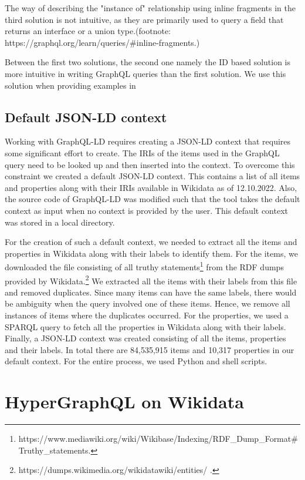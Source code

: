 The way of describing the "instance of" relationship using inline fragments in the third solution  is not intuitive, as they are primarily used to query a field that returns an interface or a union type.(footnote: https://graphql.org/learn/queries/\#inline-fragments.) 

Between the first two solutions, the second one namely the ID based solution is more intuitive in writing GraphQL queries than the first solution.  We use this solution when providing examples in 

\subsection{Default JSON-LD context}

Working with GraphQL-LD requires creating a JSON-LD context that requires some significant effort to create. The IRIs of the items used in the GraphQL query need to be looked up and then inserted into the context. To overcome this constraint we created a default JSON-LD context. This contains a list of all items and properties along with their IRIs available in Wikidata as of 12.10.2022. Also, the source code of GraphQL-LD was modified such that the tool takes the default context as input when no context is provided by the user. This default context was stored in a local directory.

For the creation of such a default context, we needed to extract all the items and properties in Wikidata along with their labels to identify them. For the items, we downloaded the file consisting of all truthy statements\footnote{https://www.mediawiki.org/wiki/Wikibase/Indexing/RDF\_Dump\_Format\#Truthy\_statements.} from the RDF dumps provided by Wikidata.\footnote{https://dumps.wikimedia.org/wikidatawiki/entities/ .} We extracted all the items with their labels from this file and removed duplicates. Since many items can have the same labels, there would be ambiguity when the query involved one of these items. Hence, we remove all instances of items where the duplicates occurred. For the properties, we used a SPARQL query to fetch all the properties in Wikidata along with their labels. Finally, a JSON-LD context was created consisting of all the items, properties and their labels. In total there are 84,535,915 items and 10,317 properties in our default context. For the entire process, we used Python and shell scripts.

\section{HyperGraphQL on Wikidata}

